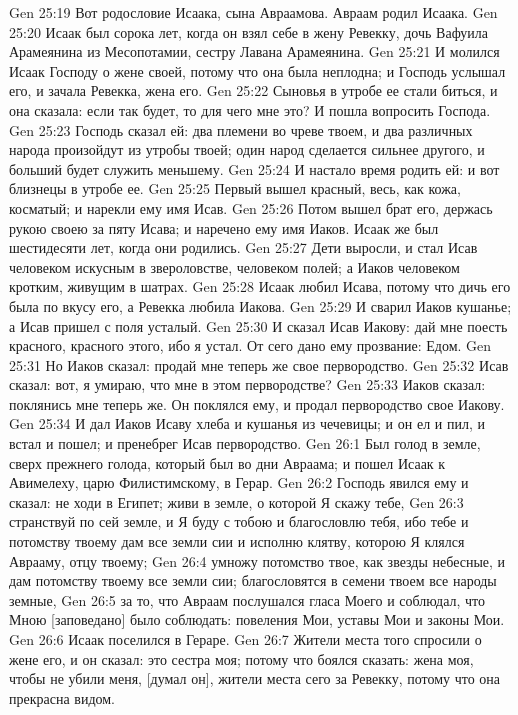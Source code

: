Gen 25:19  Вот родословие Исаака, сына Авраамова. Авраам родил Исаака.
Gen 25:20  Исаак был сорока лет, когда он взял себе в жену Ревекку, дочь Вафуила Арамеянина из Месопотамии, сестру Лавана Арамеянина.
Gen 25:21  И молился Исаак Господу о жене своей, потому что она была неплодна; и Господь услышал его, и зачала Ревекка, жена его.
Gen 25:22  Сыновья в утробе ее стали биться, и она сказала: если так будет, то для чего мне это? И пошла вопросить Господа.
Gen 25:23  Господь сказал ей: два племени во чреве твоем, и два различных народа произойдут из утробы твоей; один народ сделается сильнее другого, и больший будет служить меньшему.
Gen 25:24  И настало время родить ей: и вот близнецы в утробе ее.
Gen 25:25  Первый вышел красный, весь, как кожа, косматый; и нарекли ему имя Исав.
Gen 25:26  Потом вышел брат его, держась рукою своею за пяту Исава; и наречено ему имя Иаков. Исаак же был шестидесяти лет, когда они родились.
Gen 25:27  Дети выросли, и стал Исав человеком искусным в звероловстве, человеком полей; а Иаков человеком кротким, живущим в шатрах.
Gen 25:28  Исаак любил Исава, потому что дичь его была по вкусу его, а Ревекка любила Иакова.
Gen 25:29  И сварил Иаков кушанье; а Исав пришел с поля усталый.
Gen 25:30  И сказал Исав Иакову: дай мне поесть красного, красного этого, ибо я устал. От сего дано ему прозвание: Едом.
Gen 25:31  Но Иаков сказал: продай мне теперь же свое первородство.
Gen 25:32  Исав сказал: вот, я умираю, что мне в этом первородстве?
Gen 25:33  Иаков сказал: поклянись мне теперь же. Он поклялся ему, и продал первородство свое Иакову.
Gen 25:34  И дал Иаков Исаву хлеба и кушанья из чечевицы; и он ел и пил, и встал и пошел; и пренебрег Исав первородство.
Gen 26:1  Был голод в земле, сверх прежнего голода, который был во дни Авраама; и пошел Исаак к Авимелеху, царю Филистимскому, в Герар.
Gen 26:2  Господь явился ему и сказал: не ходи в Египет; живи в земле, о которой Я скажу тебе,
Gen 26:3  странствуй по сей земле, и Я буду с тобою и благословлю тебя, ибо тебе и потомству твоему дам все земли сии и исполню клятву, которою Я клялся Аврааму, отцу твоему;
Gen 26:4  умножу потомство твое, как звезды небесные, и дам потомству твоему все земли сии; благословятся в семени твоем все народы земные,
Gen 26:5  за то, что Авраам послушался гласа Моего и соблюдал, что Мною [заповедано] было соблюдать: повеления Мои, уставы Мои и законы Мои.
Gen 26:6  Исаак поселился в Гераре.
Gen 26:7  Жители места того спросили о жене его, и он сказал: это сестра моя; потому что боялся сказать: жена моя, чтобы не убили меня, [думал он], жители места сего за Ревекку, потому что она прекрасна видом.
